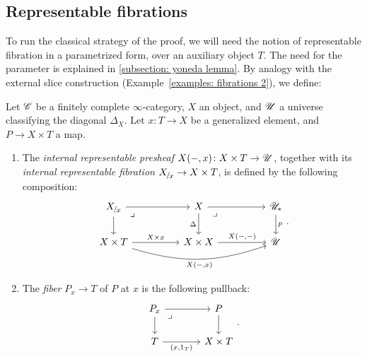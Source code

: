 \documentclass[twoside,a4paper,11pt]{amsart}
\begin{document}
\subsection{Representable fibrations}\label{subsection: representable fibrations}
To run the classical strategy of the proof, we will need the notion of representable fibration in a parametrized form, over an auxiliary object $T$. The need for the parameter is explained in \cref{subsection: yoneda lemma}. By analogy with the external slice construction (Example~\ref{examples: fibrations 2}), we define:
\begin{definition}\label{definition: internal representable presheaf and fibers}
    Let $\mathscr{C}$ be a finitely complete $\infty$-category, $X$ an object, and $\mathscr{U}$ a universe classifying the diagonal $\Delta_X$. Let $x\colon T\to X$ be a generalized element, and $P\to X\times T$ a map.
    \begin{enumerate}
        \item The \textit{internal representable presheaf} $X(-,x)\colon X\times T\to\mathscr{U}$, together with its \textit{internal representable fibration} $\slice{X}{x}\to X\times T$, is defined by the following composition:
\[\begin{tikzcd}[column sep=huge]
    {\slice{X}{x}} \arrow[r] \arrow[d] \arrow[dr, phantom, "\lrcorner"{anchor=center, pos=0.125}] & X \arrow[r] \arrow[d, "\Delta"'] \arrow[dr, phantom, "\lrcorner"{anchor=center, pos=0.125}] & {\U_\ast} \arrow[d, "p"] \\
    {X \times T} \arrow[r, "{X \times x}"] \arrow[rr, "{X(-,x)}"', bend right=18] & {X \times X} \arrow[r, "{X(-,-)}"] & \U
\end{tikzcd}.\]
\item The \textit{fiber} $P_{x}\to T$ of $P$ at $x$ is the following pullback:
\[\begin{tikzcd}[column sep=large]
    {P_{x}} \arrow[r] \arrow[d] \arrow[dr, phantom, "\lrcorner"{anchor=center, pos=0.125}] & P \arrow[d] \\
    T \arrow[r, "{(x,1_T)}"'] & {X \times T}
\end{tikzcd}.\]
\end{enumerate}
\end{definition}
\end{document}

